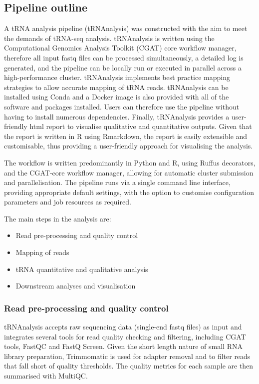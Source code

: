 \subsection{Pipeline outline}
A tRNA analysis pipeline (tRNAnalysis) was constructed with the aim to meet the demands of tRNA-seq analysis.
tRNAnalysis is written using the Computational Genomics Analysis Toolkit (CGAT) core workflow manager\cite{cribbs2019cgat}, therefore all input fastq files can be processed simultaneously, a detailed log is generated, and the pipeline can be locally run or executed in parallel across a high-performance cluster.
tRNAnalysis implements best practice mapping strategies to allow accurate mapping of tRNA reads\cite{hoffmann2018accurate}.
tRNAnalysis can be installed using Conda and a Docker image is also provided with all of the software and packages installed.
Users can therefore use the pipeline without having to install numerous dependencies.
Finally, tRNAnalysis provides a user-friendly html report to visualise qualitative and quantitative outputs.
Given that the report is written in R using Rmarkdown, the report is easily extensible and customisable, thus providing a user-friendly approach for visualising the analysis.

The workflow is written predominantly in Python and R, using Ruffus decorators\cite{goodstadt2010ruffus}, and the CGAT-core workflow manager\cite{cribbs2019cgat}, allowing for automatic cluster submission and parallelisation.
The pipeline runs via a single command line interface, providing appropriate default settings, with the option to customise configuration parameters and job resources as required.

\noindent
The main steps in the analysis are:
\begin{itemize}
  \item Read pre-processing and quality control
  \item Mapping of reads
  \item tRNA quantitative and qualitative analysis
  \item Downstream analyses and visualisation
\end{itemize}

\subsubsection{Read pre-processing and quality control}
tRNAnalysis accepts raw sequencing data (single-end fastq files) as input and integrates several tools for read quality checking and filtering, including CGAT tools\cite{sims2014cgat}, FastQC\cite{andrewfastqc} and FastQ Screen\cite{wingett2018fastq}.
Given the short length nature of small RNA library preparation, Trimmomatic\cite{bolger2014trimmomatic} is used for adapter removal and to filter reads that fall short of quality thresholds.
The quality metrics for each sample are then summarised with MultiQC\cite{ewels2016multiqc}.

